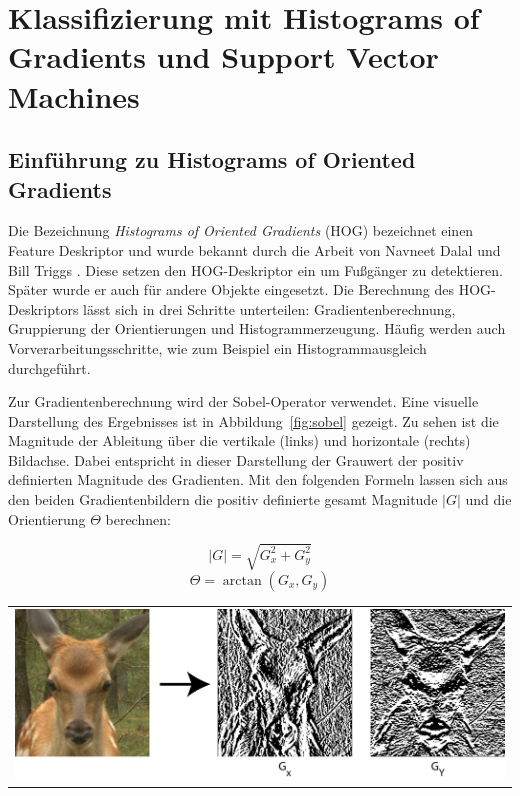 \section{Klassifizierung mit Histograms of Gradients und Support Vector Machines} \label{sec:HOG}


\subsection{Einführung zu Histograms of Oriented Gradients} \label{ssec:intro_HOG}

Die Bezeichnung \textit{Histograms of Oriented Gradients} (HOG) bezeichnet einen Feature Deskriptor und wurde bekannt durch die Arbeit von Navneet Dalal und Bill Triggs \cite{dalal05}. Diese setzen den HOG-Deskriptor ein um Fußgänger zu detektieren. Später wurde er auch für andere Objekte eingesetzt. Die Berechnung des HOG-Deskriptors lässt sich in drei Schritte unterteilen: Gradientenberechnung, Gruppierung der Orientierungen und Histogrammerzeugung. Häufig werden  auch Vorverarbeitungsschritte, wie zum Beispiel ein Histogrammausgleich durchgeführt.

Zur Gradientenberechnung wird der Sobel-Operator verwendet. Eine visuelle Darstellung des Ergebnisses ist in Abbildung~\ref{fig:sobel} gezeigt. Zu sehen ist die Magnitude der Ableitung über die vertikale (links) und horizontale (rechts) Bildachse. Dabei entspricht in dieser Darstellung der Grauwert der positiv definierten Magnitude des Gradienten. Mit den folgenden Formeln lassen sich aus den beiden Gradientenbildern die positiv definierte gesamt Magnitude $|G|$ und die Orientierung $\Theta$ berechnen:  

\begin{equation}
|G| = \sqrt{G_x^2 + G_y^2}
\end{equation}
\begin{equation}
\Theta = \arctan({G_x, G_y})
\end{equation}

\begin{center}
\begin{tabular}{c}
\includegraphics[trim={0 0cm 0cm 0cm},clip=true,width=13cm]{img/sobel.png}
\end{tabular}
\label{fig:sobel}
\end{center}


